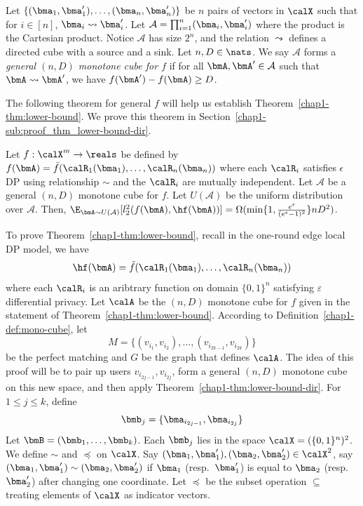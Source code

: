 \begin{definition}
  Let $\{(\bma_1,\bma_1'), \ldots, \allowbreak 
  (\bma_n,\bma_n')\}$ be
  $n$ pairs of vectors in $\calX$ such that
  for $i \in [n]$, 
  $\bma_i \leadsto \bma_i'$.
  Let $\mathcal{A} = \prod_{i=1}^n
  (\bma_i, \bma_i')$ where the product is the Cartesian product.
  Notice $\mathcal{A}$ has size $2^n$, and the relation $\leadsto$ defines a
  directed cube with a source and a sink.
  Let $n,D \in \nats$. 
  We say $\mathcal{A}$ forms a \emph{general $(n,D)$ monotone cube for $f$} if for all
  $\bmA, \bmA' \in \mathcal{A}$ such that $\bmA \leadsto \bmA'$,
  we have $f(\bmA') - f(\bmA) \geq D$.
\end{definition}

The following theorem for general $f$ will help us establish
Theorem~\ref{chap1-thm:lower-bound}. We prove this theorem in
Section~\ref{chap1-sub:proof_thm_lower-bound-dir}.
\begin{theorem}\label{chap1-thm:lower-bound-dir}
  Let $f : \calX^{m} \rightarrow \reals$ be defined by 
  $f(\bmA) = \tilde{f}(\calR_1(\bma_1), \ldots, \calR_n(\bma_n))$ where each 
  $\calR_i$ satisfies $\epsilon$ DP using relationship $\sim$ and the 
  $\calR_i$ are mutually independent.
  Let $\mathcal{A}$ be a general $(n,D)$ monotone cube for $f$. 
  Let $U(\mathcal{A})$ be the uniform distribution over $\mathcal{A}$. 
  Then,
  $\E_{\bmA \sim U(\mathcal{A})}[l_2^2(f(\bmA), \hf(\bmA))] =
  \Omega(\min\{1, \frac{e^\epsilon}{(e^\epsilon-1)^2}\}nD^2)$.
\end{theorem}

To prove Theorem~\ref{chap1-thm:lower-bound}, recall in the one-round edge local DP
model, we have
\[
  \hf(\bmA) = \tilde{f}(\calR_1(\bma_1),\ldots,\calR_n(\bma_n))
\]
where each $\calR_i$ is an aribtrary function on domain $\{0,1\}^n$ satisfying $\varepsilon$ 
differential privacy. Let $\calA$ be the $(n,D)$ monotone cube for $f$ given in
the statement of Theorem~\ref{chap1-thm:lower-bound}. According to
Definition~\ref{chap1-def:mono-cube}, let
\[
  M = \{(v_{i_1}, v_{i_2}), \ldots, (v_{i_{2k-1}}, v_{i_{2k}})\}
\]
be the perfect matching and $G$ be the graph that defines $\calA$. 
The idea of this proof will be to
pair up users $v_{i_{2j-1}}, v_{i_{2j}}$, form a general $(n,D)$ monotone cube
on this new space, and then apply Theorem~\ref{chap1-thm:lower-bound-dir}.
For $1 \leq j \leq k$, define
\[
  \bmb_j = \{\bma_{i_{2j-1}}, \bma_{i_{2j}} \}
\]
Let $\bmB = (\bmb_1,\ldots,\bmb_k)$.
Each $\bmb_j$ lies in the space $\calX = (\{0,1\}^n)^2$. We define $\sim$ and
$\preccurlyeq$ on $\calX$. Say $(\bma_1, \bma_1'), (\bma_2, \bma_2') \in
\calX^2$, say $(\bma_1, \bma_1') \sim (\bma_2, \bma_2')$ if $\bma_1$
(resp.~$\bma_1'$) is equal to $\bma_2$ (resp.~$\bma_2'$) after changing one
coordinate. Let $\preccurlyeq$ be the subset operation $\subseteq$ treating
elements of $\calX$ as indicator vectors.

